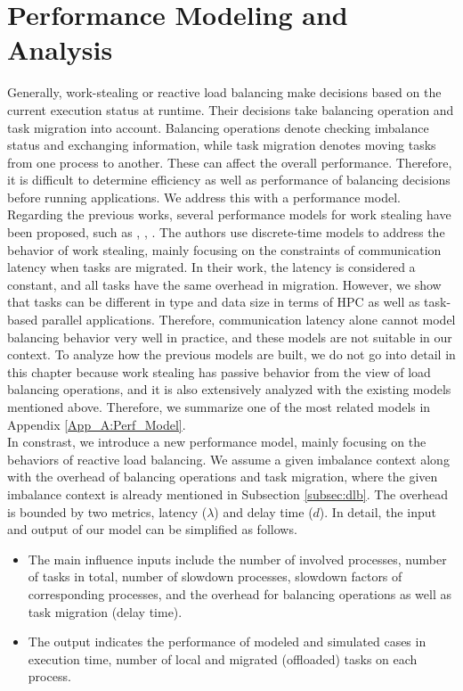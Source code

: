 \chapter{Performance Modeling and Analysis}
\label{ch:perfmodel}
\chaptertoc
\noindent

Generally, work-stealing or reactive load balancing make decisions based on the current execution status at runtime. Their decisions take balancing operation and task migration into account. Balancing operations denote checking imbalance status and exchanging information, while task migration denotes moving tasks from one process to another. These can affect the overall performance. Therefore, it is difficult to determine efficiency as well as performance of balancing decisions before running applications. We address this with a performance model.\\

Regarding the previous works, several performance models for work stealing have been proposed, such as \cite{gast2021analysis}, \cite{tchiboukdjian2010tighter}, \cite{hayat2004dyntimemodelws}. The authors use discrete-time models to address the behavior of work stealing, mainly focusing on the constraints of communication latency when tasks are migrated. In their work, the latency is considered a constant, and all tasks have the same overhead in migration. However, we show that tasks can be different in type and data size in terms of HPC as well as task-based parallel applications. Therefore, communication latency alone cannot model balancing behavior very well in practice, and these models are not suitable in our context. To analyze how the previous models are built, we do not go into detail in this chapter because work stealing has passive behavior from the view of load balancing operations, and it is also extensively analyzed with the existing models mentioned above. Therefore, we summarize one of the most related models in Appendix \ref{App_A:Perf_Model}.\\

In constrast, we introduce a new performance model, mainly focusing on the behaviors of reactive load balancing. We assume a given imbalance context along with the overhead of balancing operations and task migration, where the given imbalance context is already mentioned in Subsection \ref{subsec:dlb}. The overhead is bounded by two metrics, latency ($\lambda$) and delay time ($d$). In detail, the input and output of our model can be simplified as follows.
\begin{itemize}
	\item The main influence inputs include the number of involved processes, number of tasks in total, number of slowdown processes, slowdown factors of corresponding processes, and the overhead for balancing operations as well as task migration (delay time).
	\item The output indicates the performance of modeled and simulated cases in execution time, number of local and migrated (offloaded) tasks on each process.
\end{itemize}


